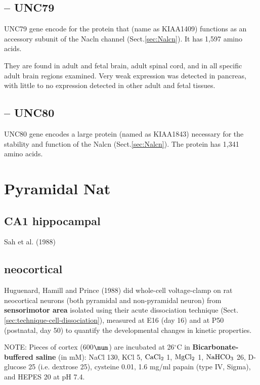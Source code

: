 \subsection{-- UNC79}
\label{sec:UNC79}

UNC79 gene encode for the protein that (name as KIAA1409) functions as an
accessory subunit of the Nacln channel (Sect.\ref{sec:Nalcn}). It has 1,597
amino acids.

They are found  in adult and fetal brain, adult spinal cord, and in all specific
adult brain regions examined. Very weak expression was detected in pancreas,
with little to no expression detected in other adult and fetal tissues.

\subsection{-- UNC80}
\label{sec:UNC80}

UNC80 gene encodes a large protein (named as KIAA1843) necessary for the
stability and function of the Nalcn (Sect.\ref{sec:Nalcn}). The protein has
1,341 amino acids. 


\section{Pyramidal Nat}
\label{sec:Nat-Pyramial}

\subsection{CA1 hippocampal}
\label{sec:Nat-Pyramial-CA1-hippocampal}

Sah et al. (1988) 

\subsection{neocortical}
\label{sec:Nat-Pyramial-neocortical}

Huguenard, Hamill and Prince (1988) did whole-cell voltage-clamp on rat
neocortical neurons (both pyramidal and non-pyramidal neuron) from {\bf
sensorimotor area} isolated using their acute dissociation technique
(Sect.\ref{sec:technique-cell-dissociation}), measured at E16 (day 16) and at
P50 (postnatal, day 50) to quantify the developmental changes in kinetic
properties. 

NOTE: Pieces of cortex (600$\mum$) are incubated at 26$^\circ$C in {\bf
Bicarbonate-buffered saline} (in mM):
NaCl 130, KCl 5, $\ce{CaCl_2}$  1, $\ce{MgCl_2}$ 1, $\ce{NaHCO_3}$  26,
D-glucose 25 (i.e. dextrose 25), cysteine 0.01, 1.6 mg/ml papain (type IV,
Sigma), and HEPES 20 at pH 7.4.


